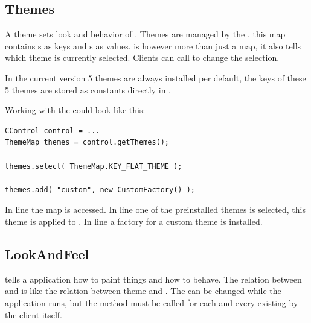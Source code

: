 
\subsection{Themes} \label{sec:theme}
A theme sets look and behavior of . Themes are managed by the , this map contains s as keys and s as values.  is however more than just a map, it also tells which theme is currently selected. Clients can call  to change the selection.

In the current version 5 themes are always installed per default, the keys of these 5 themes are stored as constants directly in .

Working with the  could look like this:
\begin{lstlisting}
CControl control = ...
ThemeMap themes = control.getThemes();

themes.select( ThemeMap.KEY_FLAT_THEME );

themes.add( "custom", new CustomFactory() );
\end{lstlisting}
In line  the map is accessed. In line  one of the preinstalled themes is selected, this theme is applied to . In line  a factory for a custom theme is installed.


\subsection{LookAndFeel} \label{sec:lookandfeel}
 tells a  application how to paint things and how to behave. The relation between  and  is like the relation between theme and . The  can be changed while the application runs, but the method  must be called for each and every existing  by the client itself.

